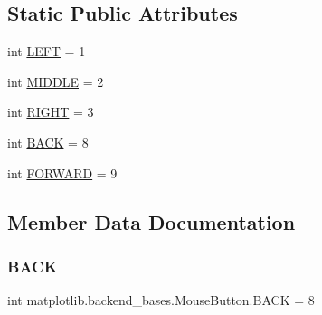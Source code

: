 \subsection*{Static Public Attributes}
\begin{DoxyCompactItemize}
\item 
int \hyperlink{classmatplotlib_1_1backend__bases_1_1MouseButton_ae8e233d820706cbadfe957ae465eeb95}{L\+E\+FT} = 1
\item 
int \hyperlink{classmatplotlib_1_1backend__bases_1_1MouseButton_ae501ff34ab8b37895cebc5046cc651a7}{M\+I\+D\+D\+LE} = 2
\item 
int \hyperlink{classmatplotlib_1_1backend__bases_1_1MouseButton_a978a5d3296f60f59521a4e671cada7c8}{R\+I\+G\+HT} = 3
\item 
int \hyperlink{classmatplotlib_1_1backend__bases_1_1MouseButton_a988abdf04094457716b076254305450c}{B\+A\+CK} = 8
\item 
int \hyperlink{classmatplotlib_1_1backend__bases_1_1MouseButton_ac38e8dfa3ac92eea2dc45930ce1649d2}{F\+O\+R\+W\+A\+RD} = 9
\end{DoxyCompactItemize}


\subsection{Member Data Documentation}
\mbox{\label{classmatplotlib_1_1backend__bases_1_1MouseButton_a988abdf04094457716b076254305450c}} 
\subsubsection{\texorpdfstring{B\+A\+CK}{BACK}}
{\footnotesize\ttfamily int matplotlib.\+backend\+\_\+bases.\+Mouse\+Button.\+B\+A\+CK = 8\hspace{0.3cm}{\ttfamily [static]}}

\mbox{\label{classmatplotlib_1_1backend__bases_1_1MouseButton_ac38e8dfa3ac92eea2dc45930ce1649d2}} 
